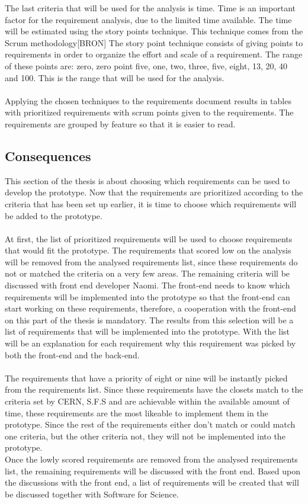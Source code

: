 \documentclass[paper=a4, fontsize=11pt,twoside]{scrartcl}	%
\begin{document}
The last criteria that will be used for the analysis is time. Time is an important factor for the requirement analysis, due to the limited time available. The time will be estimated using the story points technique. This technique comes from the Scrum methodology[BRON] The story point technique consists of giving points to requirements in order to organize the effort and scale of a requirement. The range of these points are:  zero, zero point five, one, two, three, five, eight, 13, 20, 40 and 100. This is the range that will be used for the analysis. \\ \\
Applying the chosen techniques to the requirements document results in tables with prioritized requirements with scrum points given to the requirements. The requirements are grouped by feature so that it is easier to read. \\

\newpage
\subsection{Consequences}
This section of the thesis is about choosing which requirements can be used to develop the prototype. Now that the requirements are prioritized according to the criteria that has been set up earlier, it is time to choose which requirements will be added to the prototype. \\ \\ 
At first, the list of prioritized requirements will be used to choose requirements that would fit the prototype. The requirements that scored low on the analysis will be removed from the analysed requirements list, since these requirements do not or matched the criteria on a very few areas. The remaining criteria will be discussed with front end developer Naomi. The front-end needs to know which requirements will be implemented into the prototype so that the front-end can start working on these requirements, therefore, a cooperation with the front-end on this part of the thesis is mandatory. The results from this selection will be a list of requirements that will be implemented into the prototype. With the list will be an explanation for each requirement why this requirement was picked by both the front-end and the back-end. \\ \\
The requirements that have a priority of eight or nine will be instantly picked from the requirements list. Since these requirements have the closets match to the criteria set by CERN, S.F.S and are achievable within the available amount of time, these requirements are the most likeable to implement them in the prototype. Since the rest of the requirements either don't match or could match one criteria, but the other criteria not, they will not be implemented into the prototype. \\
Once the lowly scored requirements are removed from the analysed requirements list, the remaining requirements will be discussed with the front end. Based upon the discussions with the front end, a list of requirements will be created that will be discussed together with Software for Science. \\
\end{document}
